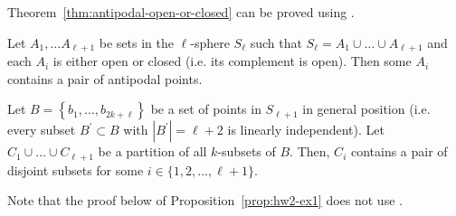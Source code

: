 Theorem~\ref{thm:antipodal-open-or-closed} can be proved using .

\begin{theorem} \label{thm:antipodal-open-or-closed}
Let \(A_1, \ldots A_{\ell+1}\) be sets in the \(\ell\)-sphere \(S_{\ell}\) such that \(S_{\ell}=A_1 \cup \ldots \cup A_{\ell+1}\) and each \(A_i\) is either open or closed (i.e. its complement is open). Then some \(A_i\) contains a pair of antipodal points.
\end{theorem}

\begin{proposition} \label{prop:hw2-ex1}
    Let \(B=\left\{b_1, \ldots, b_{2 k+\ell}\right\}\) be a set of points in \(S_{\ell+1}\) in general position (i.e. every subset \(B^{\prime} \subset B\) with \(\left|B^{\prime}\right|=\ell+2\) is linearly independent).
    Let \(C_1 \cup \ldots \cup C_{\ell+1}\) be a partition of all \(k\)-subsets of \(B\).
    Then, \(C_i\) contains a pair of disjoint subsets for some \(i \in \{1, 2, \ldots, \ell+1\}\).
\end{proposition}

Note that the proof below of Proposition~\ref{prop:hw2-ex1} does not use .

